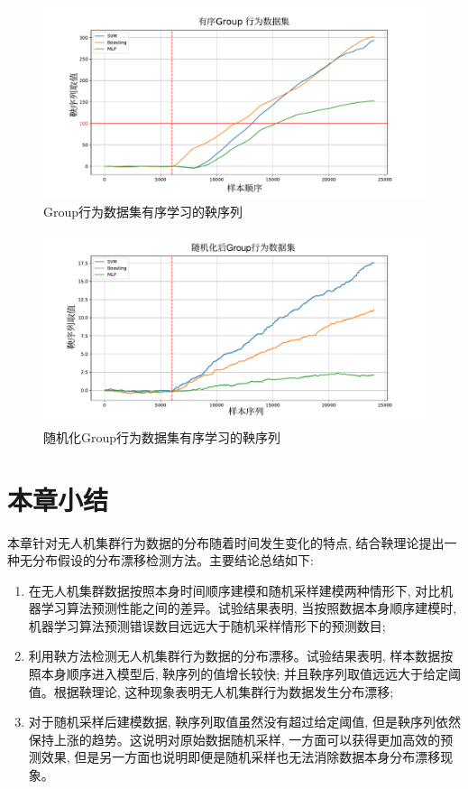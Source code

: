 \begin{figure}[htbp] %
\centerline{
\includegraphics[width=1\linewidth]{Img/chapter9/Group data set-icml}}
\caption{{Group}行为数据集有序学习的鞅序列}
\label{fig:group-mar}
\end{figure}
\begin{figure}[htbp] %
\centerline{
\includegraphics[width=1\linewidth]{Img/chapter9/Randomly shuffling Group data sett-icml}}
\caption{随机化{Group}行为数据集有序学习的鞅序列}
\label{fig:radom-group-mar}
\end{figure}


\section{本章小结}
\label{sec:mar-discuss}
本章针对无人机集群行为数据的分布随着时间发生变化的特点, 结合鞅理论提出一种无分布假设的分布漂移检测方法。主要结论总结如下:
\begin{enumerate}
\item 在无人机集群数据按照本身时间顺序建模和随机采样建模两种情形下, 对比机器学习算法预测性能之间的差异。试验结果表明, 当按照数据本身顺序建模时, 机器学习算法预测错误数目远远大于随机采样情形下的预测数目;
\item 利用鞅方法检测无人机集群行为数据的分布漂移。试验结果表明, 样本数据按照本身顺序进入模型后, 鞅序列的值增长较快; 并且鞅序列取值远远大于给定阈值。根据鞅理论, 这种现象表明无人机集群行为数据发生分布漂移;
\item 对于随机采样后建模数据, 鞅序列取值虽然没有超过给定阈值, 但是鞅序列依然保持上涨的趋势。这说明对原始数据随机采样, 一方面可以获得更加高效的预测效果, 但是另一方面也说明即便是随机采样也无法消除数据本身分布漂移现象。
\end{enumerate}